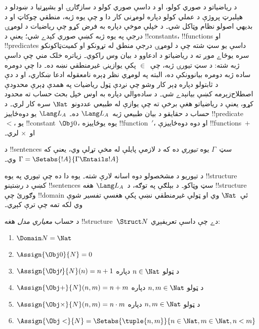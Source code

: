 \documentclass[../../../include/open-logic-section]{subfiles}
\begin{document}


د رياضياتو د صوري کولو، او د داسې صوري کولو د سازګارۍ او بشپړتيا د
ښودلو د هېلبرټ پروژې د عملي کولو دپاره لومړنی کار دا و چې يوه ژبه،
منطقي چوکاټ او د بديهي اصولو نظام وټاکل شي۔ د خپلې موخې دپاره به فرض
کړو چې رياضيات د لومړۍ درجې په يوه ژبه کښې صوري کېدے شي؛ يعنې د
!!{constant}s، !!{function}s او !!{predicate}s داسې يو سټ شته چې د
لومړۍ درجې منطق له تړونکو او کميت‌ټاکونکو سره يوځاے موږ ته د رياضياتو
د ادعاوو د بيان وس راکوي۔ زياتره خلک مني چې داسې ژبه شته: د سټ تيورۍ
ژبه، چې~$\in$ پکې يوازينۍ غيرمنطقي نښه ده۔ دا چې دومره ساده ژبه دومره
بيانوونکې ده، البته په لومړي نظر ډېره نامعقوله ادعا ښکاري، او د دې د
ثابتولو دپاره ډېر کار وشو چې نږدې ټول رياضيات په همدې ډېرې محدودې
اصطلاح‌زېرمه کښې بيانېدے شي۔ د ساده‌والي دپاره به اوس خپل بحث حساب
ته محدود کړو، يعنې د رياضياتو هغې برخې ته چې يوازې له طبيعي
عددونو~$\Nat$ سره کار لري۔ د حساب د حقايقو د بيان طبيعي ژبه~$\Lang
L_A$ ده۔ $\Lang L_A$ يو دوه‌ځاييز !!{predicate}~$<$، يو
!!{constant}~$\Obj 0$، يوه يوځاييزه !!{function}~$\prime$، او دوه
دوه‌ځاييزې !!{function}s~$+$ او~$\times$ لري۔

\begin{defn}
د !!{sentence}s سټ~$\Gamma$ يوه \emph{تيوري} ده که د لازمې پايلې له
مخې تړلې وي، يعنې که
$\Gamma = \Setabs{!A}{\Gamma \Entails !A}$ وي۔
\end{defn}

د تيوريو د مشخصولو دوه اسانه لارې شته۔ يوه دا ده چې تيوري په يوه
!!{structure} کښې د رښتينو !!{sentence}s سټ وټاکو۔ د بېلګې په توګه،
د~$\Lang L_A$ هغه !!{structure} وګورئ چې !!{domain} ئې~$\Nat$ وي او
ټولې غيرمنطقي نښې پکې هغسې تفسير شوې وي لکه تمه چې ترې کېږي۔

\begin{defn}
د حساب \emph{معياري مدل} هغه !!{structure}~$\Struct N$ دے چې داسې
تعريفېږي:
\begin{enumerate}
\item $\Domain N = \Nat$
\item $\Assign{\Obj 0}{N} = 0$
\item $\Assign{\Obj \prime}{N}(n) = n + 1$ د ټولو $n \in \Nat$ دپاره
\item $\Assign{\Obj +}{N}(n, m) = n + m$ د ټولو $n, m \in \Nat$ دپاره
\item $\Assign{\Obj \times}{N}(n, m) = n\cdot m$ د ټولو $n, m \in \Nat$ دپاره
\item $\Assign{\Obj <}{N} = \Setabs{\tuple{n, m}}{n \in \Nat, m \in
  \Nat, n < m}$
\end{enumerate}
\end{defn}
\end{document}
